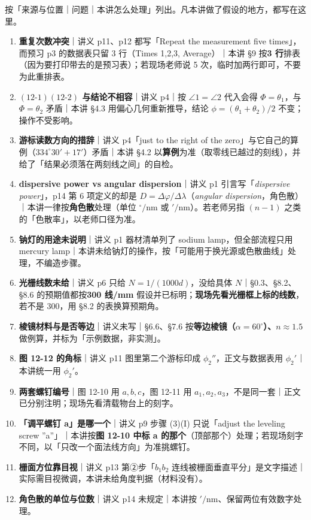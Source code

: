 \documentclass[11pt]{ctexart}
\begin{document}
按「来源与位置｜问题｜本讲怎么处理」列出。凡本讲做了假设的地方，都写在这里。

\begin{enumerate}[label=\textbf{G\arabic*.},leftmargin=2.6em]
\item \textbf{重复次数冲突}｜讲义 p11、p12 都写「Repeat the measurement five times」，而预习 p3 的数据表只留 3 行（Times 1,2,3, Average）｜本讲 §9 按\textbf{3 行}排表（因为要打印带去的是预习表）；若现场老师说 5 次，临时加两行即可，不要为此重排表。
\item \textbf{$(12\text{-}1)(12\text{-}2)$ 与结论不相容}｜讲义 p4｜按 $\angle1=\angle2$ 代入会得 $\Phi=\theta_1$，与 $\Phi=\theta_2$ 矛盾｜本讲 §4.3 用偏心几何重新推导，结论 $\phi=(\theta_1+\theta_2)/2$ 不变；操作不受影响。
\item \textbf{游标读数方向的措辞}｜讲义 p4「just to the right of the zero」与它自己的算例（$334^{\circ}30'+17'$）矛盾｜本讲 §4.2 以\textbf{算例}为准（取零线已越过的刻线），并给了「结果必须落在两刻线之间」的自检。
\item \textbf{dispersive power vs angular dispersion}｜讲义 p1 引言写「\emph{dispersive power}」，p14 第 6 项定义的却是 $D=\Delta\varphi/\Delta\lambda$（\emph{angular dispersion}，角色散）｜本讲一律按\textbf{角色散}处理（单位 $^{\circ}/\mathrm{nm}$ 或 $'/\mathrm{nm}$）。若老师另指 $(n-1)$ 之类的「色散率」，以老师口径为准。
\item \textbf{钠灯的用途未说明}｜讲义 p1 器材清单列了 sodium lamp，但全部流程只用 mercury lamp｜本讲未给钠灯的操作，按「可能用于换光源或色散曲线」处理，不编造步骤。
\item \textbf{光栅线数未给}｜讲义 p6 只给 $N=1/(1000d)$，没给具体 $N$｜§0.3、§8.2、§8.6 的预期值都按\textbf{300 线/mm} 假设并已标明；\textbf{现场先看光栅框上标的线数}，若不是 300，用 §8.2 的表换算预期角。
\item \textbf{棱镜材料与是否等边}｜讲义未写｜§6.6、§7.6 按\textbf{等边棱镜（$\alpha=60^{\circ}$）、$n\approx1.5$} 做例算，并标为「示例数据，非实测」。
\item \textbf{图 12-12 的角标}｜讲义 p11 图里第二个游标印成 $\phi_2''$，正文与数据表用 $\phi_2'$｜本讲统一用 $\phi_2'$。
\item \textbf{两套螺钉编号}｜图 12-10 用 $a,b,c$，图 12-11 用 $a_1,a_2,a_3$，不是同一套｜正文已分别注明；现场先看清载物台上的刻字。
\item \textbf{「调平螺钉 a」是哪一个}｜讲义 p9 步骤 (3)(I) 只说「adjust the leveling screw ''a''」｜本讲按\textbf{图 12-10 中标 a 的那个}（顶部那个）处理；若现场刻字不同，以「只改一个面法线方向」为准挑螺钉。
\item \textbf{栅面方位靠目视}｜讲义 p13 第②步「$b_1b_2$ 连线被栅面垂直平分」是文字描述｜实际需目视微调，本讲未给角度判据（材料没有）。
\item \textbf{角色散的单位与位数}｜讲义 p14 未规定｜本讲按 $'/\mathrm{nm}$、保留两位有效数字处理。
\end{enumerate}
\end{document}
